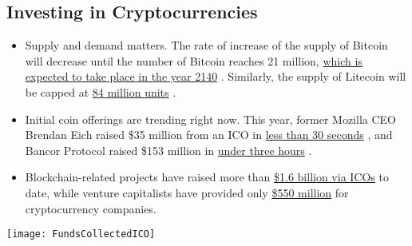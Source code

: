 	\subsection{Investing in Cryptocurrencies}
		\begin{itemize}
			\item Supply and demand matters. The rate of increase of the supply of Bitcoin will decrease until the number 
			of Bitcoin reaches 21 million, 
			\href{https://www.coindesk.com/top-10-bitcoin-myths-debunked/}{which is expected to take place in the year 2140}
			\cite{mythsDebunked}. Similarly, 
			the supply of Litecoin will be capped at 
			\href{https://support.xbtce.info/Knowledgebase/Article/View/152/59/about-litecoin}{84 million units}
			\cite{ltcLimits}.
			\item Initial coin offerings are trending right now. This year, former Mozilla CEO Brendan Eich raised \$35 
			million from an ICO in 
			\href{https://techcrunch.com/2017/06/01/brave-ico-35-million-30-seconds-brendan-eich/}{less than 30 seconds}
			\cite{techCrunch}, 
			and Bancor Protocol raised \$153 million in 
			\href{https://www.google.com/search?q=Bancor+Protoco+ico&oq=Bancor+Protocol+ico&gs_l=psy-ab.3..0i13k1l2.253.542.0.578.4.3.0.0.0.0.177.320.0j2.2.0....0...1.1.64.psy-ab..3.1.176.LOjRpj0hKrM}{under three hours}
			\cite{bancorProtocol}.
			\item Blockchain-related projects have raised more than 
			\href{https://www.coindesk.com/1-6-billion-all-time-ico-funding-climbs-as-record-500-million-invested-in-july/}{\$1.6 billion via ICOs} 
			\cite{coindeskICOAllTimeHigh} 
			to date, while venture capitalists have provided only 
			\href{http://my.pitchbook.com/?pbr=14763750}{\$550 million} \cite{pitchbook} for cryptocurrency companies.
		\end{itemize}
		\begin{center}
			\texttt{[image: FundsCollectedICO]}
		\end{center}


